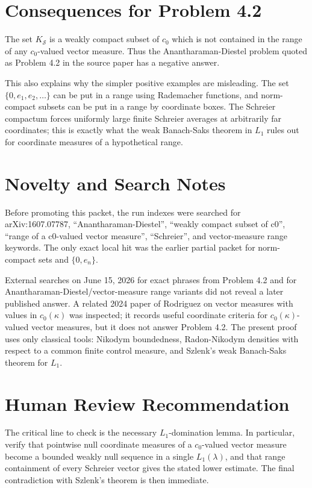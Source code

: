 \documentclass[11pt]{article}
\newcommand{\Sch}{\mathcal S}
\begin{document}
\section*{Consequences for Problem 4.2}

The set \(K_{\Sch}\) is a weakly compact subset of \(c_0\) which is not
contained in the range of any \(c_0\)-valued vector measure. Thus the
Anantharaman-Diestel problem quoted as Problem 4.2 in the source paper has a
negative answer.

This also explains why the simpler positive examples are misleading. The set
\(\{0,e_1,e_2,\ldots\}\) can be put in a range using Rademacher functions, and
norm-compact subsets can be put in a range by coordinate boxes. The Schreier
compactum forces uniformly large finite Schreier averages at arbitrarily far
coordinates; this is exactly what the weak Banach-Saks theorem in \(L_1\)
rules out for coordinate measures of a hypothetical range.

\section*{Novelty and Search Notes}

Before promoting this packet, the run indexes were searched for
arXiv:1607.07787, ``Anantharaman-Diestel'', ``weakly compact subset of c0'',
``range of a c0-valued vector measure'', ``Schreier'', and vector-measure
range keywords. The only exact local hit was the earlier partial packet for
norm-compact sets and \(\{0,e_n\}\).

External searches on June 15, 2026 for exact phrases from Problem 4.2 and for
Anantharaman-Diestel/vector-measure range variants did not reveal a later
published answer. A related 2024 paper of Rodriguez on vector measures with
values in \(c_0(\kappa)\) was inspected; it records useful coordinate
criteria for \(c_0(\kappa)\)-valued vector measures, but it does not answer
Problem 4.2. The present proof uses only classical tools: Nikodym boundedness,
Radon-Nikodym densities with respect to a common finite control measure, and
Szlenk's weak Banach-Saks theorem for \(L_1\).

\section*{Human Review Recommendation}

The critical line to check is the necessary \(L_1\)-domination lemma. In
particular, verify that pointwise null coordinate measures of a
\(c_0\)-valued vector measure become a bounded weakly null sequence in a
single \(L_1(\lambda)\), and that range containment of every Schreier vector
gives the stated lower estimate. The final contradiction with Szlenk's theorem
is then immediate.
\end{document}
